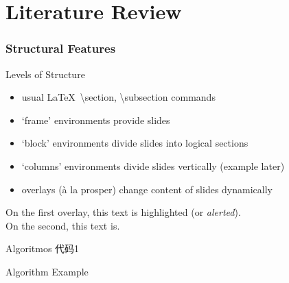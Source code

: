 \documentclass[UTF8, aspectratio=169 , 10pt，punct=kaiming]{beamer} %
\begin{document}
\section{Literature Review}


\begin{frame}
  \frametitle{Structural Features}
  \begin{block}{Levels of Structure}
    \begin{itemize}
      \item usual \LaTeX\ \textbackslash{}section, \textbackslash{}subsection commands
      \item `frame' environments provide slides
      \item `block' environments divide slides into logical sections
      \item `columns' environments divide slides vertically (example later)
      \item overlays (\`a la prosper) change content of slides dynamically
    \end{itemize}
  \end{block}
  
  \begin{example}
    On the first overlay, \alert<1>{this text} is highlighted (or \emph{alerted}).\\ On the second, \alert<2>{this text} is.
  \end{example}
\end{frame}

\begin{frame}{Algoritmos 代码1}
  \begin{algorithm}[H]
      \SetAlgoLined
      \LinesNumbered
       \caption{Algorithm Example}
  \end{algorithm}
\end{frame}
\end{document}
